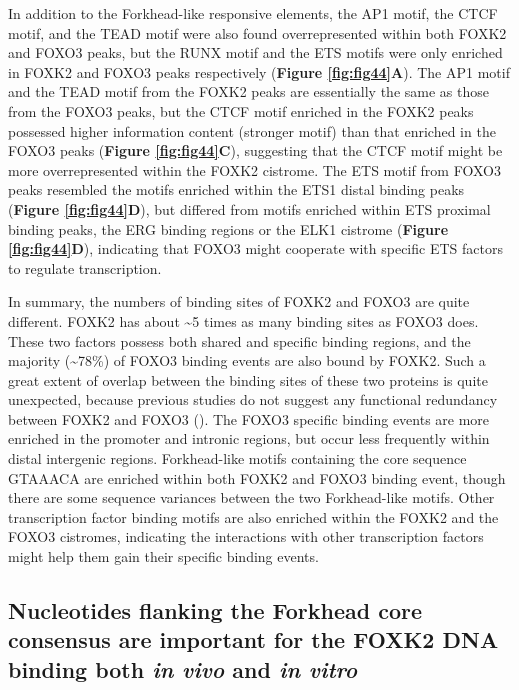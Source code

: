 In addition to the Forkhead-like responsive elements, the AP1 motif, the CTCF motif, and the TEAD motif were also found overrepresented within both FOXK2 and FOXO3 peaks, but the RUNX motif and the ETS motifs were only enriched in FOXK2 and FOXO3 peaks respectively (\textbf{Figure \ref{fig:fig44}A}). The AP1 motif and the TEAD motif from the FOXK2 peaks are essentially the same as those from the FOXO3 peaks, but the CTCF motif enriched in the FOXK2 peaks possessed higher information content (stronger motif) than that enriched in the FOXO3 peaks (\textbf{Figure \ref{fig:fig44}C}), suggesting that the CTCF motif might be more overrepresented within the FOXK2 cistrome. The ETS motif from FOXO3 peaks resembled the motifs enriched within the ETS1 distal binding peaks (\textbf{Figure \ref{fig:fig44}D}), but differed from motifs enriched within ETS proximal binding peaks, the ERG binding regions or the ELK1 cistrome (\textbf{Figure \ref{fig:fig44}D}), indicating that FOXO3 might cooperate with specific ETS factors to regulate transcription.

In summary, the numbers of binding sites of FOXK2 and FOXO3 are quite different. FOXK2 has about \textasciitilde 5 times as many binding sites as FOXO3 does. These two factors possess both shared and specific binding regions, and the majority (\textasciitilde 78\%) of FOXO3 binding events are also bound by FOXK2. Such a great extent of overlap between the binding sites of these two proteins is quite unexpected, because previous studies do not suggest any functional redundancy between FOXK2 and FOXO3 (\cite{brunet1999akt,marais2010cell,ji2012the}). The FOXO3 specific binding events are more enriched in the promoter and intronic regions, but occur less frequently within distal intergenic regions. Forkhead-like motifs containing the core sequence GTAAACA are enriched within both FOXK2 and FOXO3 binding event, though there are some sequence variances between the two Forkhead-like motifs. Other transcription factor binding motifs are also enriched within the FOXK2 and the FOXO3 cistromes, indicating the interactions with other transcription factors might help them gain their specific binding events.

\subsection{Nucleotides flanking the Forkhead core consensus are important for the FOXK2 DNA binding both \textit{in vivo} and \textit{in vitro}}

